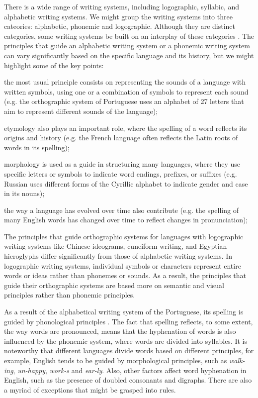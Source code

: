 \documentclass{article}
\begin{document}
There is a wide range of writing systems, including logographic, syllabic, and
alphabetic writing systems. We might group the writing systems into three
cateories: alphabetic, phonemic and logographic. Although they are distinct
categories, some writing systems be built on an interplay of these categories
\cite{coulmas2003}. The principles that guide an alphabetic writing system or
a phonemic writing system can vary significantly based on the specific language
and its history, but we might highlight some of the key points: 
\begin{enumerate*}[label=\arabic*)]
    \item the most usual principle consists on representing the sounds of a
	language with written symbols, using one or a combination of symbols to
	represent each sound (e.g. the orthographic system of Portuguese uses
	an alphabet of 27 letters that aim to represent different sounds of the
	language); 
    \item etymology also plays an important role, where the
	spelling of a word reflects its origins and history (e.g. the French
	language often reflects the Latin roots of words in its spelling);
    \item morphology is used as a guide in structuring many languages, where
	they use specific letters or symbols to indicate word endings,
	prefixes, or suffixes (e.g. Russian uses different forms of the
	Cyrillic alphabet to indicate gender and case in its nouns); 
    \item the way a language has evolved over time also contribute (e.g. the 
	spelling of many English words has changed over time to reflect changes 
	in pronunciation);
\end{enumerate*}
The principles that guide orthographic systems for languages with logographic
writing systems like Chinese ideograms, cuneiform writing, and Egyptian
hieroglyphs differ significantly from those of alphabetic writing systems. In
logographic writing systems, individual symbols or characters represent entire
words or ideas rather than phonemes or sounds. As a result, the principles that
guide their orthographic systems are based more on semantic and visual
principles rather than phonemic principles.

As a result of the alphabetical writing system of the Portuguese, its spelling
is guided by phonological principles \cite{cagliari2015}. The fact that
spelling reflects, to some extent, the way words are pronounced, means that the
hyphenation of words is also influenced by the phonemic system, where words are
divided into syllables. It is noteworthy that different languages divide words
based on different principles, for example, English tends to be guided by
morphological principles, such as \emph{walk-ing}, \emph{un-happy},
\emph{work-s} and \emph{ear-ly}. Also, other factors affect word hyphenation in
English, such as the presence of doubled consonants and digraphs. There are also 
a myriad of exceptions that might be grasped into rules.
\end{document}
